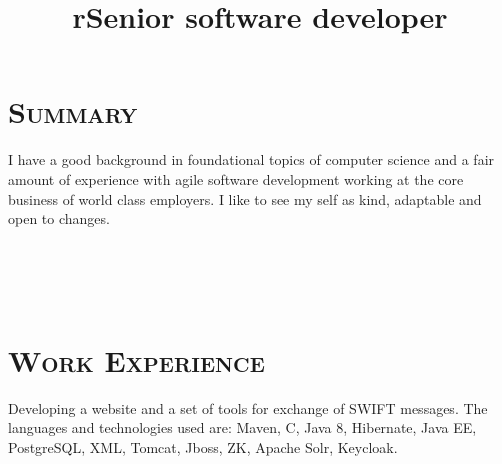     \begin{resume}

        \section{\textsc{Summary}}
        I have a good background in foundational topics of computer science
        and a fair amount of experience with agile software development working at the core business of world class employers.
        I like to see my self as kind, adaptable and open to changes.



        \begin{formatb}
            \title{r}\\
            \\
            \body\\
        \end{formatb}


        \section{\textsc{Work Experience}}

        \title{Senior software developer}
        \begin{position}
            Developing a website and a set of tools for exchange of SWIFT messages.
            The languages and technologies used are: Maven, C, Java 8, Hibernate, Java EE, PostgreSQL, XML, Tomcat, Jboss, ZK, Apache Solr, Keycloak.
        \end{position}



\end{resume}
